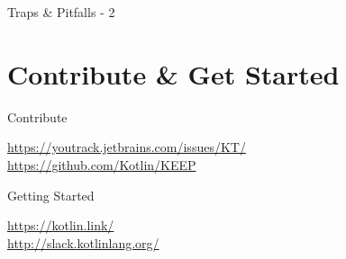 \begin{frame}{Traps \& Pitfalls - 2}
\end{frame}

\section{Contribute \& Get Started}

{
%

\begin{frame}{Contribute}
	\begin{center}
		\LARGE \href{https://youtrack.jetbrains.com/issues/KT/}{https://youtrack.jetbrains.com/issues/KT/}\\
		\href{https://github.com/Kotlin/KEEP}{https://github.com/Kotlin/KEEP}
	\end{center}
\end{frame}

\begin{frame}{Getting Started}
	\begin{center}
		\LARGE \href{https://kotlin.link/}{https://kotlin.link/}\\
		\href{http://slack.kotlinlang.org/}{http://slack.kotlinlang.org/}
	\end{center}
\end{frame}
}

